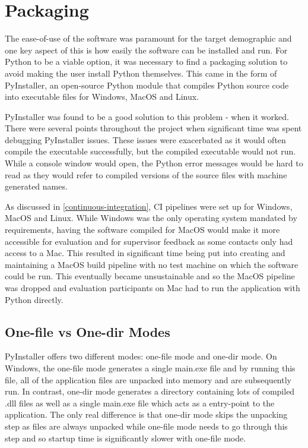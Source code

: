 \documentclass{l4proj}
\begin{document}
\section{Packaging}
The ease-of-use of the software was paramount for the target demographic and one key aspect of this is how easily the software can be installed and run. For Python to be a viable option, it was necessary to find a packaging solution to avoid making the user install Python themselves. This came in the form of PyInstaller, an open-source Python module that compiles Python source code into executable files for Windows, MacOS and Linux.

PyInstaller was found to be a good solution to this problem - when it worked. There were several points throughout the project when significant time was spent debugging PyInstaller issues. These issues were exacerbated as it would often compile the executable successfully, but the compiled executable would not run. While a console window would open, the Python error messages would be hard to read as they would refer to compiled versions of the source files with machine generated names.

As discussed in \ref{continuous-integration}, CI pipelines were set up for Windows, MacOS and Linux. While Windows was the only operating system mandated by requirements, having the software compiled for MacOS would make it more accessible for evaluation and for supervisor feedback as some contacts only had access to a Mac. This resulted in significant time being put into creating and maintaining a MacOS build pipeline with no test machine on which the software could be run. This eventually became unsustainable and so the MacOS pipeline was dropped and evaluation participants on Mac had to run the application with Python directly.

\subsection{One-file vs One-dir Modes}
PyInstaller offers two different modes: one-file mode and one-dir mode. On Windows, the one-file mode generates a single main.exe file and by running this file, all of the application files are unpacked into memory and are subsequently run. In contrast, one-dir mode generates a directory containing lots of compiled .dll files as well as a single main.exe file which acts as a entry-point to the application. The only real difference is that one-dir mode skips the unpacking step as files are always unpacked while one-file mode needs to go through this step and so startup time is significantly slower with one-file mode.
\end{document}
